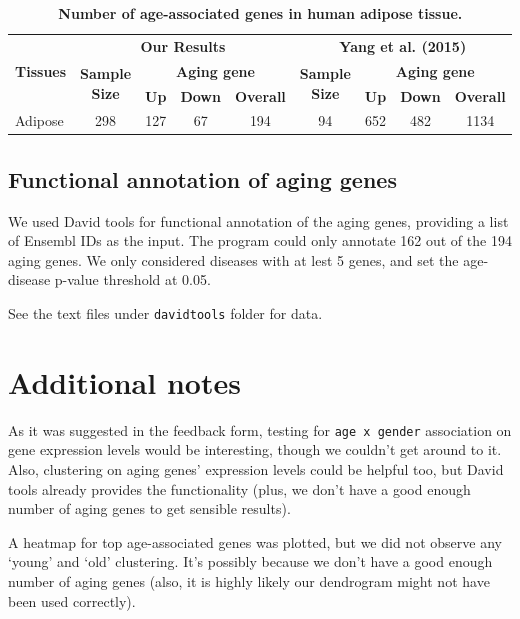 \documentclass[11pt, oneside]{article}   	%
\begin{document}
\begin{table}[b]
\centering
\begin{tabular}{|c|c|c|c|c|c|c|c|c|}
\hline
\multirow{3}{*}{\textbf{Tissues}} & \multicolumn{4}{c|}{\textbf{Our Results}}                                              & \multicolumn{4}{c|}{\textbf{Yang et al. (2015)}}                                       \\ \cline{2-9} 
                                  & \multirow{2}{*}{\textbf{Sample Size}} & \multicolumn{3}{c|}{\textbf{Aging gene}}       & \multirow{2}{*}{\textbf{Sample Size}} & \multicolumn{3}{c|}{\textbf{Aging gene}}       \\ \cline{3-5} \cline{7-9} 
                                  &                                       & \textbf{Up} & \textbf{Down} & \textbf{Overall} &                                       & \textbf{Up} & \textbf{Down} & \textbf{Overall} \\ \hline
\multicolumn{1}{|l|}{Adipose}     & 298                                   & 127         & 67            & 194              & 94                                    & 652         & 482           & 1134             \\ \hline
\end{tabular}
\caption{\textbf{Number of age-associated genes in human adipose tissue.}}
\label{table:aging-genes}
\end{table}

\subsection*{Functional annotation of aging genes}

We used David tools for functional annotation of the aging genes, providing a list of Ensembl IDs as the input. The program could only annotate 162 out of the 194 aging genes. We only considered diseases with at lest 5 genes, and set the age-disease p-value threshold at 0.05.

See the text files under \texttt{davidtools} folder for data.

\section{Additional notes}

As it was suggested in the feedback form, testing for \texttt{age x gender} association on gene expression levels would be interesting, though we couldn't get around to it. Also, clustering on aging genes' expression levels could be helpful too, but David tools already provides the functionality (plus, we don't have a good enough number of aging genes to get sensible results). 

A heatmap for top age-associated genes was plotted, but we did not observe any `young' and `old' clustering. It's possibly because we don't have a good enough number of aging genes (also, it is highly likely our dendrogram might not have been used correctly).
\end{document}
